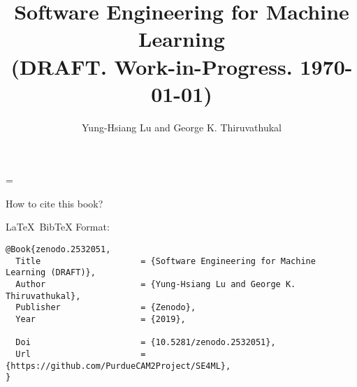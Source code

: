 

\begin{comment}

to find all files that contain a term (useful for creating index)

grep -r term * | grep tex | sed 's/:/ /g' | awk '{print $1}' | sort | uniq

\end{comment}

\newcommand{\progpath}{\basepath/../programs}

\makeatletter
\def\seealso#1#2{{\em see also\/} #1, #2}
\makeatother

\title{Software Engineering for Machine Learning \\
{\Large (DRAFT. Work-in-Progress.  \today)}}
\author{Yung-Hsiang Lu and
George K. Thiruvathukal}

%
%

\emergencystretch=\maxdimen
{}



\begin{comment}
reduce space

titlesec
http://www.ctex.org/documents/packages/layout/titlesec.pdf
wrapfig

\end{comment}

\maketitle

   
\clearpage
\vspace*{\fill}
How to cite this book?

\LaTeX\ BibTeX Format: 

\begin{verbatim}
@Book{zenodo.2532051,
  Title                    = {Software Engineering for Machine Learning (DRAFT)},
  Author                   = {Yung-Hsiang Lu and George K. Thiruvathukal},
  Publisher                = {Zenodo},
  Year                     = {2019},

  Doi                      = {10.5281/zenodo.2532051},
  Url                      = {https://github.com/PurdueCAM2Project/SE4ML},
}
\end{verbatim}

